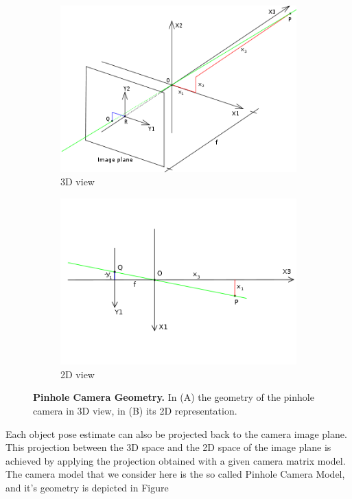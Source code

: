 \begin{figure}
	\centering
	\begin{subfigure}{.5\textwidth}
  		\centering
  		\includegraphics[width=.8\linewidth]{figures/2_benchmarks_and_metrics/pinhole_geometry_3D}
  		\caption{3D view}
  		\label{fig:sub1}
	\end{subfigure}%
	\begin{subfigure}{.5\textwidth}
  		\centering
  		\includegraphics[width=.8\linewidth]{figures/2_benchmarks_and_metrics/pinhole_geometry_2D}
  		\caption{2D view}
  		\label{fig:sub2}
	\end{subfigure}
	\caption{\textbf{Pinhole Camera Geometry.} In (A) the geometry of the pinhole camera in 3D view, in (B) its 2D representation.}
	\label{fig:test}
\end{figure}

Each object pose estimate can also be projected back to the camera image plane. This projection between the 3D space and the 2D space of the image plane is achieved by applying the projection obtained with a given camera matrix model. The camera model that we consider here is the so called Pinhole Camera Model, and it's geometry is depicted in Figure 

